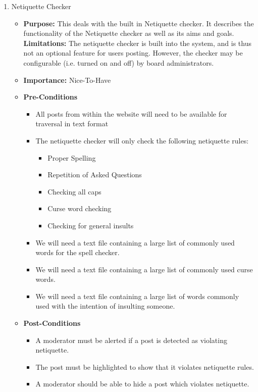 \documentclass[11pt]{article}
\begin{document}
\begin{enumerate}
\graphicspath{ {../Diagrams/Tienie/Netiquette/} }
\newpage
\item Netiquette Checker 
\begin{itemize}
\item \textbf{Purpose: }
This deals with the built in Netiquette checker. It describes the functionality of the Netiquette checker as well as its aims and goals.
\newline
\textbf{Limitations:} 
The netiquette checker is built into the system, and is thus not an optional feature for users posting. However, the checker may be configurable (i.e. turned on and off) by board administrators.
\item 	\textbf{Importance: } Nice-To-Have
	\item	\textbf{Pre-Conditions}
		\begin{itemize}
	  		\item All posts from within the website will need to be available for traversal in text format
	  		\item The netiquette checker will only check the following netiquette rules:
	  		\begin{itemize}
	  			\item Proper Spelling
	  			\item Repetition of Asked Questions
	  			\item Checking all caps
	  			\item Curse word checking
	  			\item Checking for general insults
	  		\end{itemize}
	  		\item We will need a text file containing a large list of commonly used words for the spell checker.
	  		\item We will need a text file containing a large list of commonly used curse words.
			\item We will need a text file containing a large list of words commonly used with the intention of insulting someone.
  		\end{itemize}
  	\item	\textbf{Post-Conditions}
  		\begin{itemize}
	  		\item A moderator must be alerted if a post is detected as violating netiquette.
	  		\item The post must be highlighted to show that it violates netiquette rules.
	  		\item A moderator should be able to hide a post which violates netiquette.

\end{itemize}
\end{itemize}
\end{enumerate}
\end{document}
